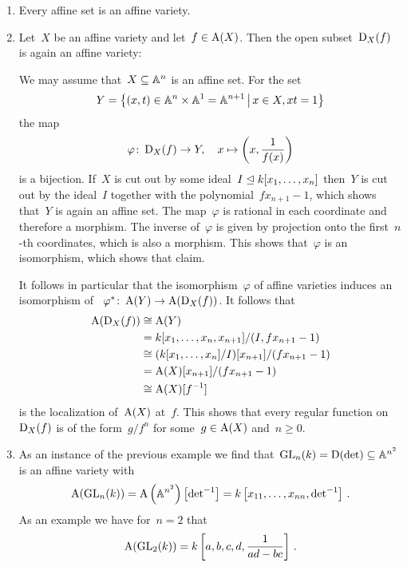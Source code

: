 \begin{example}
\label{principal open sets of affine are again affine}
  \leavevmode
  \begin{enumerate}
    \item
      Every affine set is an affine variety.
    \item
      Let~$X$ be an affine variety and let~$f \in \operatorname{A}(X)$.
      Then the open subset~$\operatorname{D}_X(f)$ is again an affine variety:
      
      We may assume that~$X \subseteq \mathbb{A}^n$ is an affine set.
      For the set
      \[
          Y
        = \left\{
                (x, t)
            \in \Aff^n \times \Aff^1
            =   \Aff^{n+1}
          \suchthat*
            x \in X,
            x t = 1
          \right\}
      \]
      the map
      \[
                \varphi
        \colon  \operatorname{D}_X(f)
        \to     Y,
        \quad   x
        \mapsto \left( x, \frac{1}{f(x)} \right)
      \]
      is a bijection.
      If~$X$ is cut out by some ideal~$I \trianglelefteq k[x_1, \dotsc, x_n]$ then~$Y$ is cut out by the ideal~$I$ together with the polynomial~$f x_{n+1} - 1$, which shows that~$Y$ is again an affine set.
      The map~$\varphi$ is rational in each coordinate and therefore a morphism.
      The inverse of~$\varphi$ is given by projection onto the first~$n$-th coordinates, which is also a morphism.
      This shows that~$\varphi$ is an isomorphism, which shows that claim.
      
      It follows in particular that the isomorphism~$\varphi$ of affine varieties induces an isomorphism of ~$\varphi^* \colon \operatorname{A}(Y) \to \operatorname{A}(\operatorname{D}_X(f))$.
      It follows that
      \begin{align*}
                \operatorname{A}(\operatorname{D}_X(f))
        &\cong  \operatorname{A}(Y) \\
        &=      k[x_1, \dotsc, x_n, x_{n+1}]/(I, f x_{n+1} - 1) \\
        &\cong  ( k[x_1, \dotsc, x_n]/I )[x_{n+1}]/(f x_{n+1} - 1) \\
        &=      \operatorname{A}(X)[x_{n+1}]/(f x_{n+1} - 1) \\
        &\cong  \operatorname{A}(X)[f^{-1}]
      \end{align*}
      is the localization of~$\operatorname{A}(X)$ at~$f$.
      This shows that every regular function on~$\operatorname{D}_X(f)$ is of the form~$g/f^n$ for some~$g \in \operatorname{A}(X)$ and~$n \geq 0$.
    \item
      As an instance of the previous example we find that~$\operatorname{GL}_n(k) = \operatorname{D}(\operatorname{det}) \subseteq \mathbb{A}^{n^2}$ is an affine variety with
      \[
          \operatorname{A}(\operatorname{GL}_n(k))
        = \operatorname{A}\left( \mathbb{A}^{n^2} \right)\left[ {\operatorname{det}}^{-1} \right]
        = k\left[ x_{11}, \dotsc, x_{nn}, {\operatorname{det}}^{-1} \right] \,.
      \]
      As an example we have for~$n = 2$ that
      \[
          \operatorname{A}(\operatorname{GL}_2(k))
        = k\left[a, b, c, d, \frac{1}{ad-bc}\right] \,.
      \]
  \end{enumerate}
\end{example}


